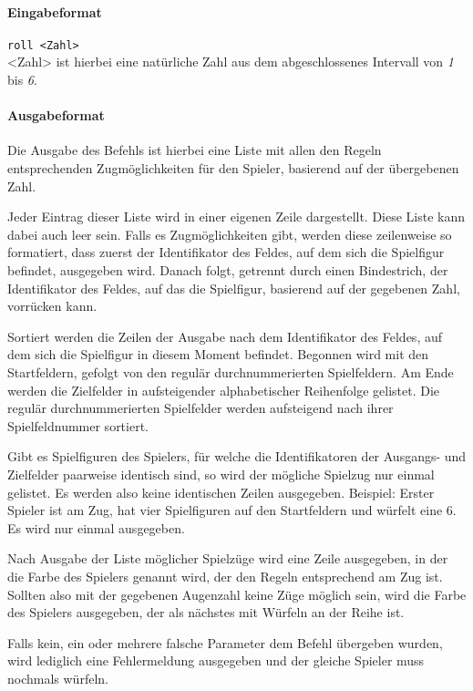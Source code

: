 \documentclass[
  name=\assignment,
  start=\releasedate,
  end=\duedate,
  subject=\lecture\,--\,\semester,
  group=\group,
  url=\theurl,
  author=\authors,
  mail=\themail
]{assignment}
\newcommand{\code}[1]{\colorbox{codegray}{\texttt{#1}}}
\begin{document}
\paragraph*{Eingabeformat}
\code{roll <Zahl>}\\
<Zahl> ist hierbei eine natürliche Zahl aus dem abgeschlossenes Intervall von \emph{1} bis \emph{6}.
\paragraph*{Ausgabeformat}
Die Ausgabe des Befehls ist hierbei eine Liste mit allen den Regeln entsprechenden Zugmöglichkeiten für den Spieler, basierend auf der übergebenen Zahl.

Jeder Eintrag dieser Liste wird in einer eigenen Zeile dargestellt. Diese Liste kann dabei auch leer sein. Falls es Zugmöglichkeiten gibt, werden diese zeilenweise so formatiert, dass zuerst der Identifikator des Feldes, auf dem sich die Spielfigur befindet, ausgegeben wird. Danach folgt, getrennt durch einen Bindestrich, der Identifikator des Feldes, auf das die Spielfigur, basierend auf der gegebenen Zahl, vorrücken kann.

Sortiert werden die Zeilen der Ausgabe nach dem Identifikator des Feldes, auf dem sich die Spielfigur in diesem Moment befindet. Begonnen wird mit den Startfeldern, gefolgt von den regulär durchnummerierten Spielfeldern. Am Ende werden die Zielfelder in aufsteigender alphabetischer Reihenfolge gelistet. Die regulär durchnummerierten Spielfelder werden aufsteigend nach ihrer Spielfeldnummer sortiert.

Gibt es Spielfiguren des Spielers, für welche die Identifikatoren der Ausgangs- und Zielfelder paarweise identisch sind, so wird der mögliche Spielzug nur einmal gelistet. Es werden also keine identischen Zeilen ausgegeben. Beispiel: Erster Spieler ist am Zug, hat vier Spielfiguren auf den Startfeldern und würfelt eine 6. Es wird nur einmal  ausgegeben.

Nach Ausgabe der Liste möglicher Spielzüge wird eine Zeile ausgegeben, in der die Farbe des Spielers genannt wird, der den Regeln entsprechend am Zug ist.
Sollten also mit der gegebenen Augenzahl keine Züge möglich sein, wird die Farbe des Spielers ausgegeben, der als nächstes mit Würfeln an der Reihe ist.

Falls kein, ein oder mehrere falsche Parameter dem Befehl übergeben wurden, wird lediglich eine Fehlermeldung ausgegeben und der gleiche Spieler muss nochmals würfeln.
\end{document}
